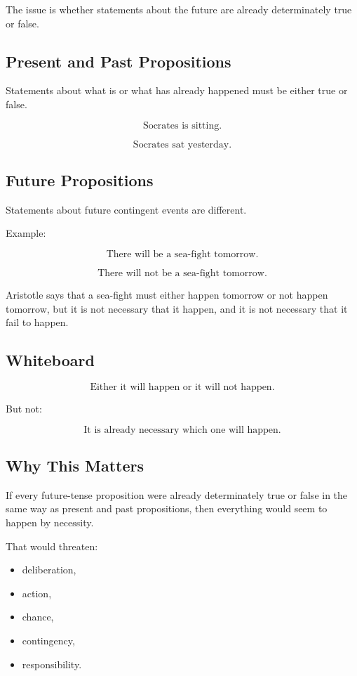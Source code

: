 \documentclass[12pt]{article}
\begin{document}
The issue is whether statements about the future are already determinately true
or false.

\subsection*{Present and Past Propositions}

Statements about what is or what has already happened must be either true or
false.

\[
\text{Socrates is sitting.}
\]

\[
\text{Socrates sat yesterday.}
\]

\subsection*{Future Propositions}

Statements about future contingent events are different.

Example:

\[
\text{There will be a sea-fight tomorrow.}
\]

\[
\text{There will not be a sea-fight tomorrow.}
\]

Aristotle says that a sea-fight must either happen tomorrow or not happen
tomorrow, but it is not necessary that it happen, and it is not necessary that
it fail to happen.

\subsection*{Whiteboard}

\[
\boxed{
\text{Either it will happen or it will not happen.}
}
\]

But not:

\[
\boxed{
\text{It is already necessary which one will happen.}
}
\]

\subsection*{Why This Matters}

If every future-tense proposition were already determinately true or false in
the same way as present and past propositions, then everything would seem to
happen by necessity.

That would threaten:

\begin{itemize}[itemsep=0.25em]
    \item deliberation,
    \item action,
    \item chance,
    \item contingency,
    \item responsibility.
\end{itemize}
\end{document}
